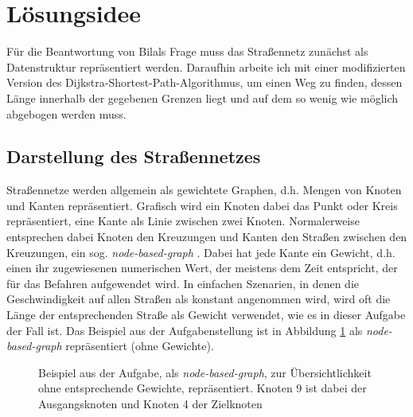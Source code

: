 \documentclass[a4paper,10pt,ngerman]{scrartcl}
\title{\Aufgabe}
\author{\Name\\Team-ID: \Einsendenummer}
\date{\today}
\begin{document}
\maketitle
\tableofcontents

\section{Lösungsidee}
\label{sec:idea}
Für die Beantwortung von Bilals Frage muss das Straßennetz zunächst als Datenstruktur repräsentiert werden.
Daraufhin arbeite ich mit einer modifizierten Version des Dijkstra-Shortest-Path-Algorithmus, um einen Weg zu finden, dessen Länge innerhalb der gegebenen Grenzen liegt und auf dem so wenig wie möglich abgebogen werden muss.

\subsection{Darstellung des Straßennetzes}
\label{sec:idea:representation}
Straßennetze werden allgemein als gewichtete Graphen, d.h. Mengen von Knoten und Kanten repräsentiert.
Grafisch wird ein Knoten dabei das Punkt oder Kreis repräsentiert, eine Kante als Linie zwischen zwei Knoten. 
Normalerweise entsprechen dabei Knoten den Kreuzungen und Kanten den Straßen zwischen den Kreuzungen, ein sog. \textit{node-based-graph} \cite{geisberger}.
Dabei hat jede Kante ein Gewicht, d.h. einen ihr zugewiesenen numerischen Wert, der meistens dem Zeit entspricht, der für das Befahren aufgewendet wird.
In einfachen Szenarien, in denen die Geschwindigkeit auf allen Straßen als konstant angenommen wird, wird oft die Länge der entsprechenden Straße als Gewicht verwendet, wie es in dieser Aufgabe der Fall ist.
Das Beispiel aus der Aufgabenstellung ist in Abbildung \ref{fig:graph-idee} als \textit{node-based-graph} repräsentiert (ohne Gewichte).

\begin{figure}
\centering
{}
\label{fig:graph-idee}
\caption{Beispiel aus der Aufgabe, als \textit{node-based-graph}, zur Übersichtlichkeit ohne entsprechende Gewichte, repräsentiert. Knoten 9 ist dabei der Ausgangsknoten und Knoten 4 der Zielknoten}
\end{figure}
\end{document}
